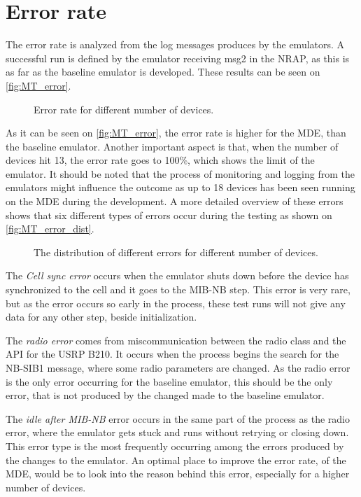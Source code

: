 \section{Error rate}
\label{sec:MTerror}
The error rate is analyzed from the log messages produces by the emulators. A successful run is defined by the emulator receiving msg2 in the NRAP, as this is as far as the baseline emulator is developed. These results can be seen on \autoref{fig:MT_error}.

\begin{figure}[H]
\centering

\caption{Error rate for different number of devices.}
\label{fig:MT_error}
\end{figure}

As it can be seen on \autoref{fig:MT_error}, the error rate is higher for the MDE, than the baseline emulator. Another important aspect is that, when the number of devices hit 13, the error rate goes to 100\%, which shows the limit of the emulator. It should be noted that the process of monitoring and logging from the emulators might influence the outcome as up to 18 devices has been seen running on the MDE during the development. A more detailed overview of these errors shows that six different types of errors occur during the testing as shown on \autoref{fig:MT_error_dist}.

\begin{figure}[H]
\centering
\resizebox{\textwidth}{!}{
}
\caption{The distribution of different errors for different number of devices.}
\label{fig:MT_error_dist}
\end{figure}

The \textit{Cell sync error} occurs when the emulator shuts down before the device has synchronized to the cell and it goes to the MIB-NB step. This error is very rare, but as the error occurs so early in the process, these test runs will not give any data for any other step, beside initialization.

The \textit{radio error} comes from miscommunication between the radio class and the API for the USRP B210. It occurs when the process begins the search for the NB-SIB1 message, where some radio parameters are changed. As the radio error is the only error occurring for the baseline emulator, this should be the only error, that is not produced by the changed made to the baseline emulator.

The \textit{idle after MIB-NB} error occurs in the same part of the process as the radio error, where the emulator gets stuck and runs without retrying or closing down. This error type is the most frequently occurring among the errors produced by the changes to the emulator. An optimal place to improve the error rate, of the MDE, would be to look into the reason behind this error, especially for a higher number of devices.


